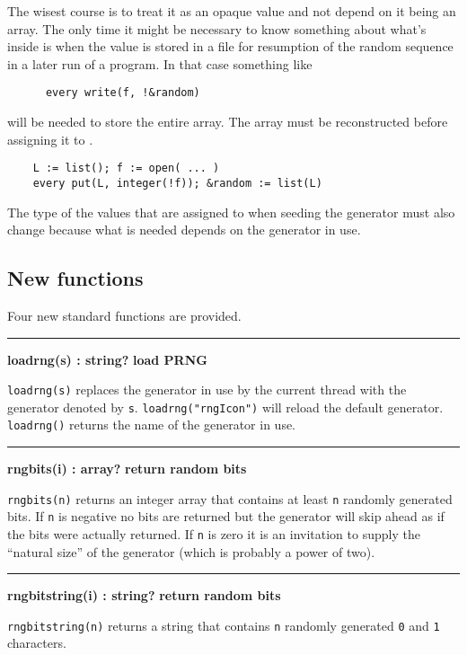 \documentclass[letterpaper,12pt]{article}
\begin{document}
The wisest course is to treat it as an opaque value and not depend on it being an array.
The only time it might be necessary to know something about what's inside \rndkwd is when
the value is stored in a file for resumption of the random sequence in a later run of a
program. In that case something like
\begin{verbatim}
      every write(f, !&random)
\end{verbatim}
will be needed to store the entire array. The array must be reconstructed before
assigning it to \rndkwd.
\begin{verbatim}
    L := list(); f := open( ... )
    every put(L, integer(!f)); &random := list(L)
\end{verbatim}

The type of the values that are assigned to \rndkwd when seeding the generator must
also change because what is needed depends on the generator in use.

\subsection{New functions}
Four new standard functions are provided.

\bigskip\hrule\vspace{0.1cm}
\noindent
{\bf loadrng(s) : string? } \hfill {\bf load PRNG}

\noindent
\texttt{loadrng(s)} replaces the generator in use by the current thread with the generator
denoted by \texttt{s}. \texttt{loadrng("rngIcon")} will reload the default generator.
\texttt{loadrng()} returns the name of the generator in use.

\bigskip\hrule\vspace{0.1cm}
\noindent
{\bf rngbits(i) : array? } \hfill {\bf return random bits}

\noindent
\texttt{rngbits(n)} returns an integer array that contains at least \texttt{n} randomly
generated bits. If \texttt{n} is negative no bits are returned but the generator will skip
ahead as if the bits were actually returned. If \texttt{n} is zero it is an invitation to
supply the ``natural size'' of the generator (which is probably a power of two).

\bigskip\hrule\vspace{0.1cm}
\noindent
{\bf rngbitstring(i) : string? } \hfill {\bf return random bits}

\noindent
\texttt{rngbitstring(n)} returns a string that contains \texttt{n}
randomly generated \texttt{0} and \texttt{1} characters.
\end{document}
